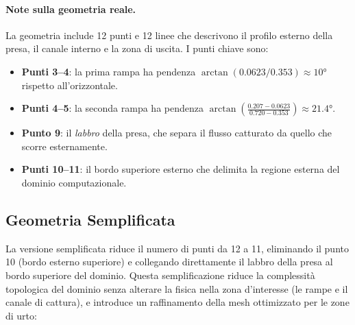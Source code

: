 \paragraph{Note sulla geometria reale.}
La geometria include 12 punti e 12 linee che descrivono il profilo esterno della presa, il
canale interno e la zona di uscita. I punti chiave sono:
\begin{itemize}
  \item \textbf{Punti 3--4}: la prima rampa ha pendenza
    $\arctan(0.0623/0.353) \approx 10°$ rispetto all'orizzontale.
  \item \textbf{Punti 4--5}: la seconda rampa ha pendenza
    $\arctan\!\left(\frac{0.207-0.0623}{0.720-0.353}\right) \approx 21.4°$.
  \item \textbf{Punto 9}: il \emph{labbro} della presa, che separa il flusso catturato da
    quello che scorre esternamente.
  \item \textbf{Punti 10--11}: il bordo superiore esterno che delimita la regione esterna
    del dominio computazionale.
\end{itemize}

\subsection{Geometria Semplificata}
\label{sec:presa_semplificata}

La versione semplificata riduce il numero di punti da 12 a 11, eliminando il punto 10
(bordo esterno superiore) e collegando direttamente il labbro della presa al bordo superiore
del dominio. Questa semplificazione riduce la complessità topologica del dominio senza
alterare la fisica nella zona d'interesse (le rampe e il canale di cattura), e
introduce un raffinamento della mesh ottimizzato per le zone di urto:

